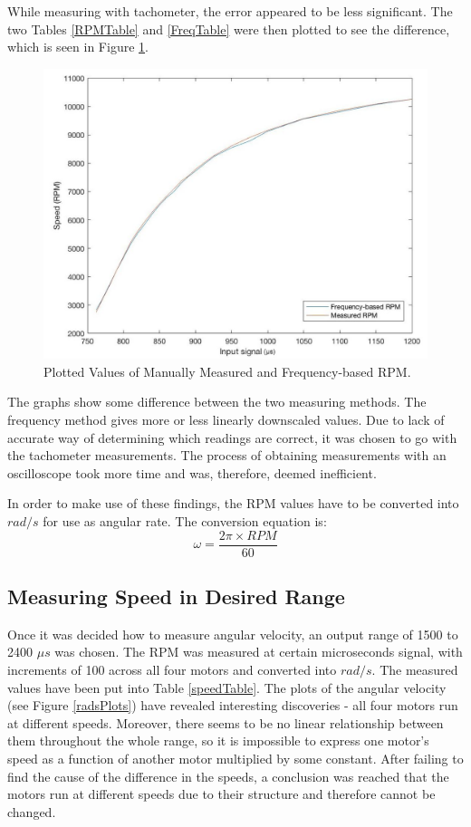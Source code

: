 While measuring with tachometer, the error appeared to be less significant.
The two Tables \ref{RPMTable} and \ref{FreqTable} were then plotted to see the difference, which is seen in Figure \ref{RPMvsFreq}.

\begin{figure}[H]
  \centering
    \includegraphics[width=1\textwidth]{images/rpm66.jpg}
	\caption{Plotted Values of Manually Measured and Frequency-based RPM.}
	\label{RPMvsFreq}
\end{figure}

The graphs show some difference between the two measuring methods. The frequency method gives more or less linearly downscaled values. Due to lack of accurate way of determining which readings are correct, it was chosen to go with the tachometer measurements. The process of obtaining measurements with an oscilloscope took more time and was, therefore, deemed inefficient.

In order to make use of these findings, the RPM values have to be converted into $rad/s$ for use as angular rate. The conversion equation is:
\begin{equation}
\label{RPMConvert}
	\omega = \frac{2\pi \times RPM}{60}
\end{equation}

\subsection{Measuring Speed in Desired Range}
Once it was decided how to measure angular velocity, an output range of 1500 to 2400 $\mu s$ was chosen. The RPM was measured at certain microseconds signal, with increments of 100 across all four motors and converted into $rad/s$. The measured values have been put into Table \ref{speedTable}.
The plots of the angular velocity (see Figure \ref{radsPlots}) have revealed interesting discoveries - all four motors run at different speeds. Moreover, there seems to be no linear relationship between them throughout the whole range, so it is impossible to express one motor's speed as a function of another motor multiplied by some constant. After failing to find the cause of the difference in the speeds, a conclusion was reached that the motors run at different speeds due to their structure and therefore cannot be changed.

